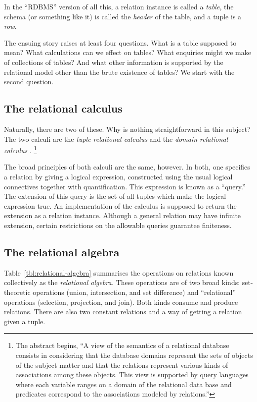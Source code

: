 \documentclass[10pt, a4paper, twocolumn]{article}
\begin{document}
In the ``RDBMS'' version of all this, a relation instance is called a
\emph{table}, the schema (or something like it) is called the \emph{header} of
the table, and a tuple is a \emph{row}.

The ensuing story raises at least four questions. What is a table
supposed to mean? What calculations can we effect on tables? What enquiries
might we make of collections of tables? And what other information is supported
by the relational model other than the brute existence of tables? We start with
the second question.

\subsection{The relational calculus}




Naturally, there are two of these. Why is nothing straightforward in this
subject? The two calculi are the \emph{tuple relational calculus} \parencite[][the
  original one]{codd1972relational} and the \emph{domain relational calculus}
\parencite{lacroix1977calculus}.%
\footnote{The abstract begins, ``A view of the semantics of a relational
database consists in considering that the database domains represent the sets of
objects of the subject matter and that the relations represent various kinds of
associations among these objects. This view is supported by query languages
where each variable ranges on a domain of the relational data base and
predicates correspond to the associations modeled by relations.''}

The broad principles of both calculi are the same, however. In both, one
specifies a relation by giving a logical expression, constructed using the usual
logical connectives together with quantification. This expression is known as a
``query.'' The extension of this query is the set of all tuples which make the
logical expression true. An implementation of the calculus is supposed to return
the extension as a relation instance. Although a general relation may have
infinite extension, certain restrictions on the allowable queries guarantee
finiteness.






\subsection{The relational algebra}

Table~\ref{tbl:relational-algebra} summarises the operations on relations known
collectively as the \emph{relational algebra.} These operations are of two broad
kinds: set-theoretic operations (union, intersection, and set difference) and
``relational'' operations (selection, projection, and join). Both kinds consume
and produce relations. There are also two constant relations and a way of
getting a relation given a tuple.
\end{document}
